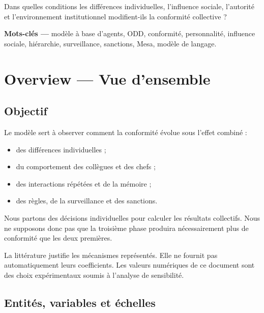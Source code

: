 \documentclass[10pt,a4paper]{article}
\begin{document}
\begin{keybox}[title=Question scientifique]
Dans quelles conditions les différences individuelles, l’influence sociale,
l’autorité et l’environnement institutionnel modifient-ils la conformité
collective ?
\end{keybox}

\textbf{Mots-clés —} modèle à base d’agents, ODD, conformité, personnalité,
influence sociale, hiérarchie, surveillance, sanctions, Mesa, modèle de
langage.

\newpage
\begingroup
\small
\setlength{\parskip}{0pt}
\tableofcontents
\endgroup

\newpage
{}

\section{Overview — Vue d’ensemble}

\subsection{Objectif}

Le modèle sert à observer comment la conformité évolue sous l’effet combiné :

\begin{itemize}
  \item des différences individuelles ;
  \item du comportement des collègues et des chefs ;
  \item des interactions répétées et de la mémoire ;
  \item des règles, de la surveillance et des sanctions.
\end{itemize}

Nous partons des décisions individuelles pour calculer les résultats collectifs.
Nous ne supposons donc pas que la troisième phase produira nécessairement plus
de conformité que les deux premières.

\begin{warningbox}[title=Statut des valeurs numériques]
La littérature justifie les mécanismes représentés. Elle ne fournit pas
automatiquement leurs coefficients. Les valeurs numériques de ce document sont
des choix expérimentaux soumis à l’analyse de sensibilité.
\end{warningbox}

\subsection{Entités, variables et échelles}
\end{document}
